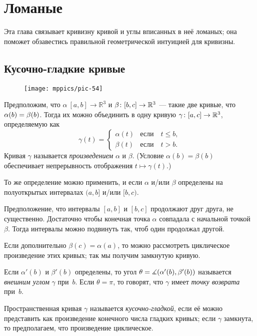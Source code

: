 \chapter{Ломаные}
\label{chap:poly}

Эта глава связывает кривизну кривой и углы вписанных в неё ломаных;
она поможет обзавестись правильной геометрической интуицией для кривизны.

\section{Кусочно-гладкие кривые}

\begin{wrapfigure}{o}{25 mm}
\vskip-0mm
\centering
\texttt{[image: mppics/pic-54]}
\end{wrapfigure}

Предположим, что $\alpha\:[a,b]\to \mathbb{R}^3$ и $\beta\:[b,c]\z\to \mathbb{R}^3$ --- такие две кривые, что $\alpha(b)\z=\beta(b)$.
Тогда их можно объединить в одну кривую $\gamma\:[a,c]\z\to \mathbb{R}^3$, определяемую как 
\[\gamma(t)=
\begin{cases}
\alpha(t)&\text{если}\quad t\le b,
\\
\beta(t)&\text{если}\quad t> b.
\end{cases}
\]
Кривая $\gamma$ называется 
\emph{произведением} $\alpha$ и $\beta$.
(Условие $\alpha(b)=\beta(b)$ обеспечивает непрерывность отображения $t\mapsto\gamma(t)$.)

То же определение можно применить, и если $\alpha$ и/или $\beta$ определены на полуоткрытых интервалах 
$(a,b]$ и/или $[b,c)$.

Предположение, что интервалы $[a,b]$ и $[b,c]$ продолжают друг друга, не существенно.
Достаточно чтобы конечная точка $\alpha$ совпадала с начальной точкой $\beta$.
Тогда интервалы можно подвинуть так, чтоб один продолжал другой. 

Если дополнительно $\beta(c)=\alpha(a)$, то можно рассмотреть циклическое произведение этих кривых;
так мы получим замкнутую кривую.

Если $\alpha'(b)$ и $\beta'(b)$ определены, то угол $\theta\z=\measuredangle(\alpha'(b),\beta'(b))$ называется \emph{внешним углом} $\gamma$ при~$b$.
Если $\theta=\pi$, то говорят, что $\gamma$ имеет \emph{точку возврата} при~$b$.

Пространственная кривая $\gamma$ называется \emph{кусочно-гладкой}, если её можно представить как произведение конечного числа гладких кривых; если $\gamma$ замкнута, то предполагаем, что произведение циклическое.

